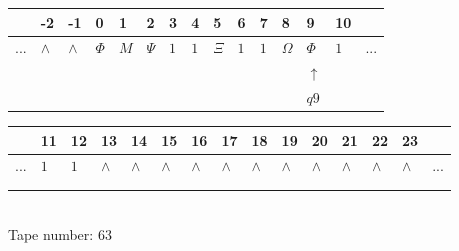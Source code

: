\documentclass[11pt]{article}
\begin{document}
\begin{table}[H]
\centering
\begin{tabular}{lllllllllllllll}
 & -2 & -1 & 0 & 1 & 2 & 3 & 4 & 5 & 6 & 7 & 8 & 9 & 10 & \\
\hline
$...$ & \multicolumn{1}{|l|}{$\wedge$} & \multicolumn{1}{|l|}{$\wedge$} & \multicolumn{1}{|l|}{$\Phi$} & \multicolumn{1}{|l|}{$M$} & \multicolumn{1}{|l|}{$\Psi$} & \multicolumn{1}{|l|}{$1$} & \multicolumn{1}{|l|}{$1$} & \multicolumn{1}{|l|}{$\Xi$} & \multicolumn{1}{|l|}{$1$} & \multicolumn{1}{|l|}{$1$} & \multicolumn{1}{|l|}{$\Omega$} & \multicolumn{1}{|l|}{$\Phi$} & \multicolumn{1}{|l|}{$1$} & $...$\\
\hline
&  &  &  &  &  &  &  &  &  &  &  & $\uparrow$ &  &  \\
&  &  &  &  &  &  &  &  &  &  &  & $ q9 $ &  &  \\
\end{tabular}
\begin{tabular}{lllllllllllllll}
 & 11 & 12 & 13 & 14 & 15 & 16 & 17 & 18 & 19 & 20 & 21 & 22 & 23 & \\
\hline
$...$ & \multicolumn{1}{|l|}{$1$} & \multicolumn{1}{|l|}{$1$} & \multicolumn{1}{|l|}{$\wedge$} & \multicolumn{1}{|l|}{$\wedge$} & \multicolumn{1}{|l|}{$\wedge$} & \multicolumn{1}{|l|}{$\wedge$} & \multicolumn{1}{|l|}{$\wedge$} & \multicolumn{1}{|l|}{$\wedge$} & \multicolumn{1}{|l|}{$\wedge$} & \multicolumn{1}{|l|}{$\wedge$} & \multicolumn{1}{|l|}{$\wedge$} & \multicolumn{1}{|l|}{$\wedge$} & \multicolumn{1}{|l|}{$\wedge$} & $...$\\
\hline
&  &  &  &  &  &  &  &  &  &  &  &  &  &  \\
&  &  &  &  &  &  &  &  &  &  &  &  &  &  \\
\end{tabular}
\\
Tape number: 63
\noindent\makebox[\linewidth]{\hdashrule{\textwidth}{1pt}{1pt}}\end{table}
\clearpage
\end{document}
